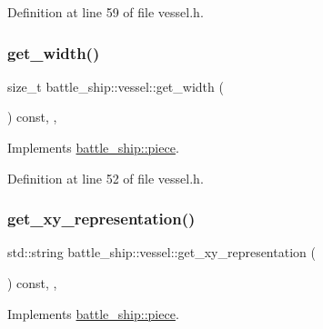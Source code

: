 Definition at line 59 of file vessel.\+h.

\mbox{\label{classbattle__ship_1_1vessel_a84716baaafee9839292f67b03abc7272}} 
\subsubsection{\texorpdfstring{get\+\_\+width()}{get\_width()}}
{\footnotesize\ttfamily size\+\_\+t battle\+\_\+ship\+::vessel\+::get\+\_\+width (\begin{DoxyParamCaption}{ }\end{DoxyParamCaption}) const\hspace{0.3cm}{\ttfamily [inline]}, {\ttfamily [override]}, {\ttfamily [virtual]}}



Implements \hyperlink{classbattle__ship_1_1piece_abd5b9073f2fa6201c4dbc35b43942d2f}{battle\+\_\+ship\+::piece}.



Definition at line 52 of file vessel.\+h.

\mbox{\label{classbattle__ship_1_1vessel_a84bfaba9be4f15f6ec934c925d11967d}} 
\subsubsection{\texorpdfstring{get\+\_\+xy\+\_\+representation()}{get\_xy\_representation()}}
{\footnotesize\ttfamily std\+::string battle\+\_\+ship\+::vessel\+::get\+\_\+xy\+\_\+representation (\begin{DoxyParamCaption}{ }\end{DoxyParamCaption}) const\hspace{0.3cm}{\ttfamily [inline]}, {\ttfamily [override]}, {\ttfamily [virtual]}}



Implements \hyperlink{classbattle__ship_1_1piece_ad589faff3ce07b5130bfdd89da4269c1}{battle\+\_\+ship\+::piece}.



